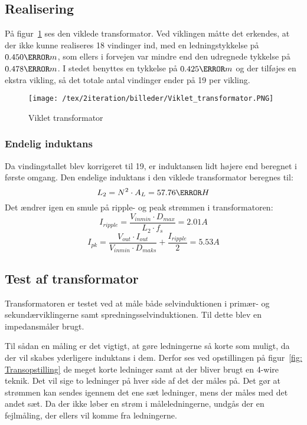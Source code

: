 \subsection{Realisering}
På figur~\ref{fig: Viklettrans} ses den viklede transformator. Ved viklingen måtte det erkendes, at der ikke kunne realiseres 18 vindinger ind, med en ledningstykkelse på $0.450\milli m$, som ellers i forvejen var mindre end den udregnede tykkelse på $0.478\milli m$. I stedet benyttes en tykkelse på $0.425\milli m$ og der tilføjes en ekstra vikling, så det totale antal vindinger ender på 19 per vikling. 

\begin{figure}[H]
	\center
	\texttt{[image: /tex/2iteration/billeder/Viklet\_transformator.PNG]}
	\caption{Viklet transformator}
	\label{fig: Viklettrans}
\end{figure}


\subsubsection{Endelig induktans}
Da vindingstallet blev korrigeret til 19, er induktansen lidt højere end beregnet i første omgang. Den endelige induktans i den viklede transformator beregnes til:
\begin{equation} \label{L_2}
L_2 = N^2 \cdot A_L = 57.76\micro H
\end{equation}
Det ændrer igen en smule på ripple- og peak strømmen i transformatoren:
\begin{equation} \label{I_ripple_final}
I_{ripple} = \frac{V_{inmin} \cdot D_{max}}{L_2 \cdot f_s} = 2.01A
\end{equation}
\begin{equation} \label{I_pk_final}
I_{pk} = \frac{V_{out} \cdot I_{out}}{V_{inmin} \cdot D_{maks}} + \frac{I_{ripple}}{2} = 5.53A
\end{equation}

\subsection{Test af transformator}
Transformatoren er testet ved at måle både selvinduktionen i primær- og sekundærviklingerne samt spredningsselvinduktionen. Til dette blev en impedansmåler brugt. 


Til sådan en måling er det vigtigt, at gøre ledningerne så korte som muligt, da der vil skabes yderligere induktans i dem. Derfor ses ved opstillingen på figur~\ref{fig: Transopstilling} de meget korte ledninger samt at der bliver brugt en 4-wire teknik. Det vil sige to ledninger på hver side af det der måles på. Det gør at strømmen kan sendes igennem det ene sæt ledninger, mens der måles med det andet sæt. Da der ikke løber en strøm i måleledningerne, undgås der en fejlmåling, der ellers vil komme fra ledningerne. 

